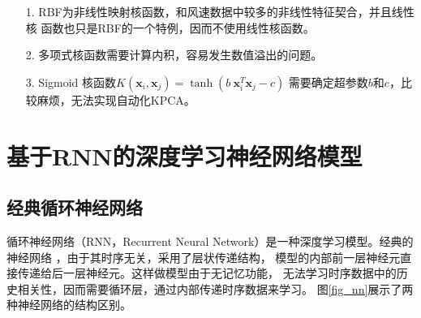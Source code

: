 \documentclass[AutoFakeBold]{LZUThesis}
\begin{document}
\begin{itemize}
\item[1. ] RBF为非线性映射核函数，和风速数据中较多的非线性特征契合，并且线性核
函数也只是RBF的一个特例，因而不使用线性核函数。
\item[2. ] 多项式核函数需要计算内积，容易发生数值溢出的问题。
\item[3. ] Sigmoid 核函数$K(\mathbf x_i,\mathbf x_j)=\tanh(b\:\mathbf x_i^T\mathbf x_j-c)$
需要确定超参数$b$和$c$，比较麻烦，无法实现自动化KPCA。 
\end{itemize}

\section{基于RNN的深度学习神经网络模型}
\subsection{经典循环神经网络}
循环神经网络（RNN，Recurrent Neural Network）是一种深度学习模型。经典的神经网络
，由于其时序无关，采用了层状传递结构，
模型的内部前一层神经元直接传递给后一层神经元。这样做模型由于无记忆功能，
无法学习时序数据中的历史相关性，因而需要循环层，通过内部传递时序数据来学习。
图\ref{fig_nn}展示了两种神经网络的结构区别。
\end{document}
